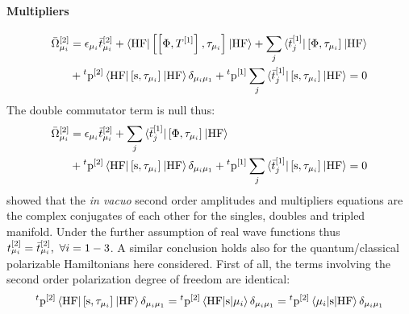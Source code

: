 \paragraph*{Multipliers}
\begin{equation}
  \begin{aligned}
  \bar{\Omega}_{\mu_i}^{[2]} &=
    \epsilon_{\mu_i}\bar{t}_{\mu_i}^{[2]}
    + \braket{\mathrm{HF} | \left[ \left[ \Phi, T^{[1]} \right]^{}, \tau_{\mu_i} \right]^{} | \mathrm{HF}}
    + \sum_j\braket{\bar{t}_{j}^{[1]} |
    \left[ \Phi, \tau_{\mu_i} \right]^{} | \mathrm{HF}} \\
    &+ {}^t\mathrm{p}^{[2]}\braket{\mathrm{HF} |
    \left[ \mathrm{s}, \tau_{\mu_i} \right]^{} | \mathrm{HF}}\delta_{\mu_i\mu_1}
    + {}^t\mathrm{p}^{[1]}
    \sum_j\braket{\bar{t}_{j}^{[1]} |
    \left[ \mathrm{s}, \tau_{\mu_i} \right]^{} | \mathrm{HF}}
    =0
  \end{aligned}
\end{equation}
The double commutator term is null thus:~\autocite{Koch1997-nm, Helgaker2000-tz}
\begin{equation}\label{eq:2nd-order-mult}
  \begin{aligned}
  \bar{\Omega}_{\mu_i}^{[2]} &=
    \epsilon_{\mu_i}\bar{t}_{\mu_i}^{[2]}
    + \sum_j\braket{\bar{t}_{j}^{[1]} |
    \left[ \Phi, \tau_{\mu_i} \right]^{} | \mathrm{HF}} \\
    &+ {}^t\mathrm{p}^{[2]}\braket{\mathrm{HF} |
    \left[ \mathrm{s}, \tau_{\mu_i} \right]^{} | \mathrm{HF}}\delta_{\mu_i\mu_1}
    + {}^t\mathrm{p}^{[1]}
    \sum_j\braket{\bar{t}_{j}^{[1]} |
    \left[ \mathrm{s}, \tau_{\mu_i} \right]^{} | \mathrm{HF}}
    =0
  \end{aligned}
\end{equation}
\citeauthor{Koch1997-nm} showed that the \emph{in vacuo} second order
amplitudes and multipliers equations are the complex conjugates of each
other for the singles, doubles and tripled manifold. Under the further
assumption of real wave functions thus $t_{\mu_i}^{[2]} =
\bar{t}_{\mu_i}^{[2]},\,\,\forall i = 1 - 3$.
A similar conclusion holds also for the quantum/classical polarizable
Hamiltonians here considered.
First of all, the terms involving the second order polarization degree of
freedom are identical:
\begin{equation}
    {}^t\mathrm{p}^{[2]}\braket{\mathrm{HF} | \left[ \mathrm{s}, \tau_{\mu_i} \right]^{} | \mathrm{HF}}\delta_{\mu_i\mu_1}
    =
    {}^t\mathrm{p}^{[2]}\braket{\mathrm{HF} | \mathrm{s}|\mu_i}\delta_{\mu_i\mu_1}
    =
    {}^t\mathrm{p}^{[2]}\braket{\mu_i| \mathrm{s}|\mathrm{HF}}\delta_{\mu_i\mu_1}
\end{equation}
